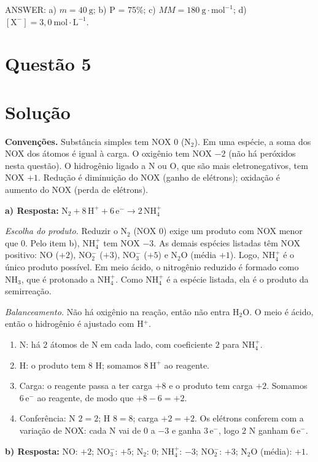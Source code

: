 \documentclass{article}%
\begin{document}
ANSWER: a) $m = 40\ \mathrm{g}$; b) P = 75\%; c) $MM = 180\ \mathrm{g\cdot mol^{-1}}$; d) $[\mathrm{X}^{-}] = 3{,}0\ \mathrm{mol\cdot L^{-1}}$.%
\newpage%
\section*{Questão 5}

\section*{Solução}

\textbf{Convenções.} Substância simples tem NOX $0$ (N$_2$). Em uma espécie, a soma dos NOX dos átomos é igual à carga. O oxigênio tem NOX $-2$ (não há peróxidos nesta questão). O hidrogênio ligado a N ou O, que são mais eletronegativos, tem NOX $+1$. Redução é diminuição do NOX (ganho de elétrons); oxidação é aumento do NOX (perda de elétrons).

\textbf{a) Resposta:} $\mathrm{N_2 + 8\,H^{+} + 6\,e^{-} \longrightarrow 2\,NH_4^{+}}$

\emph{Escolha do produto.} Reduzir o N$_2$ (NOX $0$) exige um produto com NOX menor que $0$. Pelo item b), NH$_4^+$ tem NOX $-3$. As demais espécies listadas têm NOX positivo: NO ($+2$), NO$_2^-$ ($+3$), NO$_3^-$ ($+5$) e N$_2$O (média $+1$). Logo, NH$_4^+$ é o único produto possível. Em meio ácido, o nitrogênio reduzido é formado como NH$_3$, que é protonado a NH$_4^+$. Como NH$_4^+$ é a espécie listada, ela é o produto da semirreação.

\emph{Balanceamento.} Não há oxigênio na reação, então não entra H$_2$O. O meio é ácido, então o hidrogênio é ajustado com H$^+$.
\begin{enumerate}
\item N: há $2$ átomos de N em cada lado, com coeficiente $2$ para NH$_4^+$.
\item H: o produto tem $8$ H; somamos $8\,\mathrm{H^+}$ ao reagente.
\item Carga: o reagente passa a ter carga $+8$ e o produto tem carga $+2$. Somamos $6\,\mathrm{e^-}$ ao reagente, de modo que $+8-6=+2$.
\item Conferência: N $2=2$; H $8=8$; carga $+2=+2$. Os elétrons conferem com a variação de NOX: cada N vai de $0$ a $-3$ e ganha $3\,\mathrm{e^-}$, logo $2$ N ganham $6\,\mathrm{e^-}$.
\end{enumerate}

\textbf{b) Resposta:} NO: $+2$; NO$_3^-$: $+5$; N$_2$: $0$; NH$_4^+$: $-3$; NO$_2^-$: $+3$; N$_2$O (média): $+1$.
\end{document}
